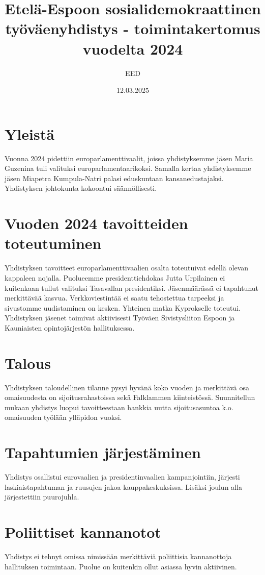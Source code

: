 \documentclass[a4paper,12pt]{article}
\title{Etelä-Espoon sosialidemokraattinen työväenyhdistys - toimintakertomus vuodelta 2024}
\author{EED}
\date{12.03.2025}
\begin{document}
\maketitle
\section{Yleistä}
Vuonna 2024 pidettiin europarlamenttivaalit, joissa yhdistyksemme jäsen Maria Guzenina tuli valituksi europarlamentaarikoksi. Samalla kertaa yhdistyksemme jäsen Miapetra Kumpula-Natri palasi eduskuntaan kansanedustajaksi. Yhdistyksen johtokunta kokoontui säännöllisesti.
\section{Vuoden 2024 tavoitteiden toteutuminen}
Yhdistyksen tavoitteet europarlamenttivaalien osalta toteutuivat edellä olevan kappaleen nojalla. Puolueemme presidenttiehdokas Jutta Urpilainen ei kuitenkaan tullut valituksi Tasavallan presidentiksi. Jäsenmäärässä ei tapahtunut merkittävää kasvua. Verkkoviestintää ei saatu tehostettua tarpeeksi ja sivustomme uudistaminen on kesken. Yhteinen matka Kyprokselle toteutui. Yhdistyksen jäsenet toimivat aktiivisesti Työväen Sivistysliiton Espoon ja Kauniaisten opintojärjestön hallituksessa.
\section{Talous}
Yhdistyksen taloudellinen tilanne pysyi hyvänä koko vuoden ja merkittävä osa omaisuudesta on sijoitusrahastoissa sekä Falklammen kiinteistössä. Suunnitellun mukaan yhdistys luopui tavoitteestaan hankkia uutta sijoitusasuntoa k.o. omaisuuden työlään ylläpidon vuoksi.
\section{Tapahtumien järjestäminen}
Yhdistys osallistui eurovaalien ja presidentinvaalien kampanjointiin, järjesti laskiaistapahtuman ja ruusujen jakoa kauppakeskuksissa. Lisäksi joulun alla järjestettiin puurojuhla.
\section{Poliittiset kannanotot}
Yhdistys ei tehnyt omissa nimissään merkittäviä poliittisia kannanottoja hallituksen toimintaan. Puolue on kuitenkin ollut asiassa hyvin aktiivinen.
\end{document}
